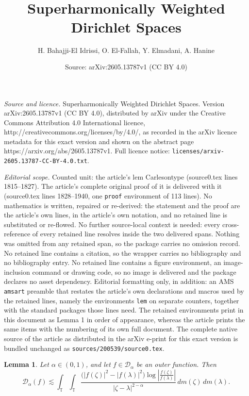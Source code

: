 \documentclass[10pt,a4paper]{amsart}
\title{Superharmonically Weighted Dirichlet Spaces}
\author{H. Bahajji-El Idrissi, O. El-Fallah, Y. Elmadani, A. Hanine}
\date{Source: arXiv:2605.13787v1 (CC BY 4.0)}
\newtheorem{lem}{Lemma}
\newcommand{\cD}{{\mathcal{D}}}
\begin{document}
\maketitle

\noindent\emph{Source and licence.} Superharmonically Weighted Dirichlet Spaces. Version arXiv:2605.13787v1 (CC BY 4.0), distributed by arXiv under the Creative Commons Attribution 4.0 International licence, http://creativecommons.org/licenses/by/4.0/, as recorded in the arXiv licence metadata for this exact version and shown on the abstract page https://arxiv.org/abs/2605.13787v1. Full licence notice: \texttt{licenses/arxiv-2605.13787-CC-BY-4.0.txt}.\par\smallskip

\noindent\textit{Editorial scope.} Counted unit: the article's lem Carlesontype (source0.tex lines 1815--1827). The article's complete original proof of it is delivered with it (source0.tex lines 1828--1940, one \texttt{proof} environment of 113 lines). No mathematics is written, repaired or re-derived: the statement and the proof are the article's own lines, in the article's own notation, and no retained line is substituted or re-flowed.  No further source-local context is needed: every cross-reference of every retained line resolves inside the two delivered spans.  Nothing was omitted from any retained span, so the package carries no omission record.  No retained line contains a citation, so the wrapper carries no bibliography and no bibliography entry.  No retained line contains a figure environment, an image-inclusion command or drawing code, so no image is delivered and the package declares no asset dependency.  Editorial formatting only, in addition: an AMS \texttt{amsart} preamble that restates the article's own declarations and macros used by the retained lines, namely the environments \texttt{lem} on separate counters, together with the standard packages those lines need.  The retained environments print in this document as Lemma 1 in order of appearance, whereas the article prints the same items with the numbering of its own full document.  The complete native source of the article as distributed in the arXiv e-print for this exact version is bundled unchanged as \texttt{sources/200539/source0.tex}.
	\begin{lem}\label{Carlesontype}
		Let $\alpha \in (0,1)$, and let $f \in \cD_\alpha$ be an outer function. Then
		\[
		\cD_\alpha(f)
		\lesssim
		\int_{\mathbb T}
		\int_{\mathbb T}
		\frac{\bigl(|f(\zeta)|^2 - |f(\lambda)|^2\bigr)
			\log \left|\frac{f(\zeta)}{f(\lambda)}\right|}
		{|\zeta-\lambda|^{2-\alpha}}
		\, dm(\zeta)\, dm(\lambda).
		\]
	\end{lem}
\end{document}
